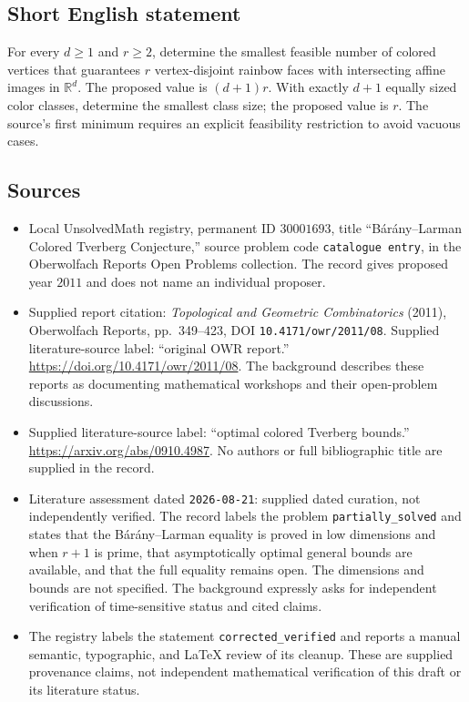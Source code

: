 \documentclass[11pt]{article}
\newcommand{\R}{\mathbb{R}}
\begin{document}
\subsection{Short English statement}
For every \(d\geq1\) and \(r\geq2\), determine the smallest feasible number of colored vertices that guarantees \(r\) vertex-disjoint rainbow faces with intersecting affine images in \(\R^d\). The proposed value is \((d+1)r\). With exactly \(d+1\) equally sized color classes, determine the smallest class size; the proposed value is \(r\). The source's first minimum requires an explicit feasibility restriction to avoid vacuous cases.
\subsection{Sources}
\begin{itemize}
\item Local UnsolvedMath registry, permanent ID \(30001693\), title ``B\'ar\'any--Larman Colored Tverberg Conjecture,'' source problem code \texttt{catalogue entry}, in the Oberwolfach Reports Open Problems collection. The record gives proposed year \(2011\) and does not name an individual proposer.
\item Supplied report citation: \emph{Topological and Geometric Combinatorics} (2011), Oberwolfach Reports, pp.\ 349--423, DOI \texttt{10.4171/owr/2011/08}. Supplied literature-source label: ``original OWR report.'' \url{https://doi.org/10.4171/owr/2011/08}. The background describes these reports as documenting mathematical workshops and their open-problem discussions.
\item Supplied literature-source label: ``optimal colored Tverberg bounds.'' \url{https://arxiv.org/abs/0910.4987}. No authors or full bibliographic title are supplied in the record.
\item Literature assessment dated \texttt{2026-08-21}: supplied dated curation, not independently verified. The record labels the problem \texttt{partially\_solved} and states that the B\'ar\'any--Larman equality is proved in low dimensions and when \(r+1\) is prime, that asymptotically optimal general bounds are available, and that the full equality remains open. The dimensions and bounds are not specified. The background expressly asks for independent verification of time-sensitive status and cited claims.
\item The registry labels the statement \texttt{corrected\_verified} and reports a manual semantic, typographic, and LaTeX review of its cleanup. These are supplied provenance claims, not independent mathematical verification of this draft or its literature status.
\end{itemize}
\end{document}
